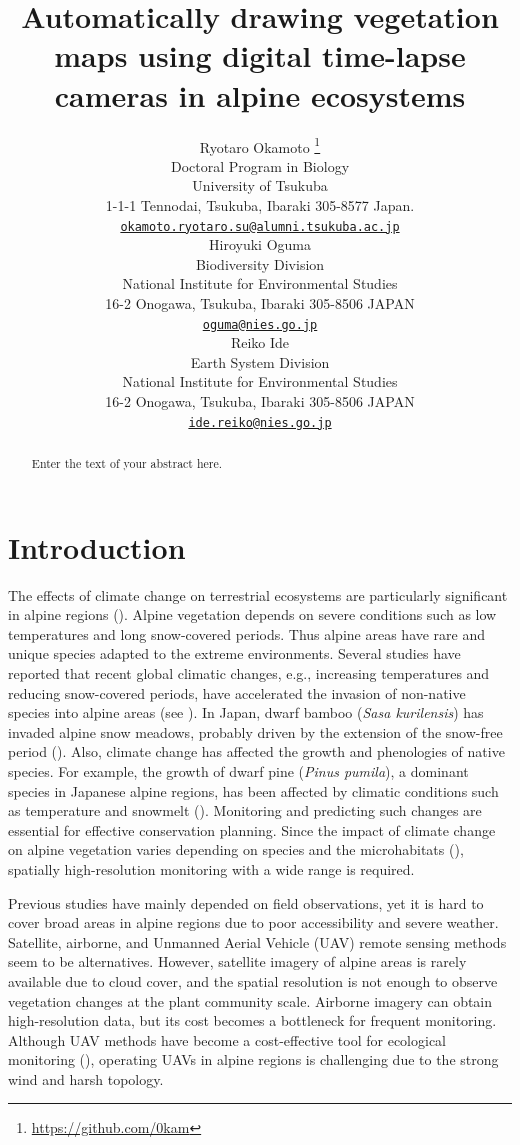 \documentclass{article}
\title{Automatically drawing vegetation maps using digital time-lapse cameras in alpine ecosystems}
\author{
    Ryotaro Okamoto
    \thanks{\url{https://github.com/0kam}}
   \\
    Doctoral Program in Biology \\
    University of Tsukuba \\
  1-1-1 Tennodai, Tsukuba, Ibaraki 305-8577 Japan. \\
  \texttt{\href{mailto:okamoto.ryotaro.su@alumni.tsukuba.ac.jp}{\nolinkurl{okamoto.ryotaro.su@alumni.tsukuba.ac.jp}}} \\
   \And
    Hiroyuki Oguma
   \\
    Biodiversity Division \\
    National Institute for Environmental Studies \\
  16-2 Onogawa, Tsukuba, Ibaraki 305-8506 JAPAN \\
  \texttt{\href{mailto:oguma@nies.go.jp}{\nolinkurl{oguma@nies.go.jp}}} \\
   \And
    Reiko Ide
   \\
    Earth System Division \\
    National Institute for Environmental Studies \\
  16-2 Onogawa, Tsukuba, Ibaraki 305-8506 JAPAN \\
  \texttt{\href{mailto:ide.reiko@nies.go.jp}{\nolinkurl{ide.reiko@nies.go.jp}}} \\
  }
\begin{document}
\maketitle


\begin{abstract}
Enter the text of your abstract here.
\end{abstract}


\hypertarget{introduction}{%
\section{Introduction}\label{introduction}}

The effects of climate change on terrestrial ecosystems are particularly significant in alpine regions (\cite{IPCC2007}). Alpine vegetation depends on severe conditions such as low temperatures and long snow-covered periods. Thus alpine areas have rare and unique species adapted to the extreme environments. Several studies have reported that recent global climatic changes, e.g., increasing temperatures and reducing snow-covered periods, have accelerated the invasion of non-native species into alpine areas (see \cite{Alexander2016AlpBotany}). In Japan, dwarf bamboo (\emph{Sasa kurilensis}) has invaded alpine snow meadows, probably driven by the extension of the snow-free period (\cite{Kudo2011EcoEvo}). Also, climate change has affected the growth and phenologies of native species. For example, the growth of dwarf pine (\emph{Pinus pumila}), a dominant species in Japanese alpine regions, has been affected by climatic conditions such as temperature and snowmelt (\cite{Amagai2015EcoRes}). Monitoring and predicting such changes are essential for effective conservation planning. Since the impact of climate change on alpine vegetation varies depending on species and the microhabitats (\cite{Kudo2010AAA}), spatially high-resolution monitoring with a wide range is required.

Previous studies have mainly depended on field observations, yet it is hard to cover broad areas in alpine regions due to poor accessibility and severe weather. Satellite, airborne, and Unmanned Aerial Vehicle (UAV) remote sensing methods seem to be alternatives. However, satellite imagery of alpine areas is rarely available due to cloud cover, and the spatial resolution is not enough to observe vegetation changes at the plant community scale. Airborne imagery can obtain high-resolution data, but its cost becomes a bottleneck for frequent monitoring. Although UAV methods have become a cost-effective tool for ecological monitoring (\cite{Baena2017PLOSONE}), operating UAVs in alpine regions is challenging due to the strong wind and harsh topology.
\end{document}
